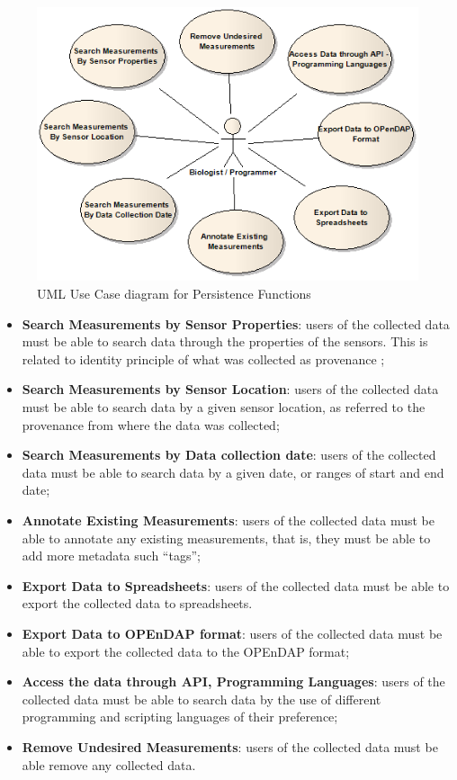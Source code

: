 \begin{figure}[!b]
  \centering
  \includegraphics[scale=0.5]{../diagrams/DSP-Data-Persistence-UseCases-Diagram-Users}
  \caption{UML Use Case diagram for Persistence Functions}
  \label{fig:DSP-Data-Persistence-UseCases-Diagram-Users}
\end{figure}

\begin{itemize}
  \item \textbf{Search Measurements by Sensor Properties}: users of the
  collected data must be able to search data through the properties of the
  sensors. This is related to identity principle of what was collected
  as provenance \cite{db-provenance};
  \item \textbf{Search Measurements by Sensor Location}: users of the collected
  data must be able to search data by a given sensor location, as referred to
  the provenance from where the data was collected;
  \item \textbf{Search Measurements by Data collection date}: users of the
  collected data must be able to search data by a given date, or ranges of
  start and end date;
  \item \textbf{Annotate Existing Measurements}: users of the collected data
  must be able to annotate any existing measurements, that is, they must be
  able to add more metadata such ``tags'';
  \item \textbf{Export Data to Spreadsheets}: users of the collected data must
  be able to export the collected data to spreadsheets.
  \item \textbf{Export Data to OPEnDAP format}: users of the collected data
  must be able to export the collected data to the OPEnDAP format;
  \item \textbf{Access the data through API, Programming Languages}: users of the
  collected data must be able to search data by the use of different
  programming and scripting languages of their preference;
  \item \textbf{Remove Undesired Measurements}: users of
  the collected data must be able remove any collected data.
\end{itemize}

